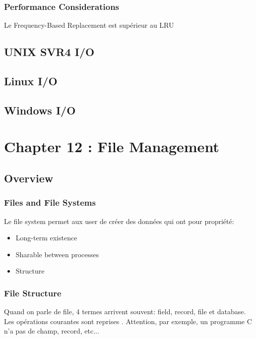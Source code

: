 \subsubsection{Performance Considerations}
Le Frequency-Based Replacement est supérieur au LRU

\subsection{UNIX SVR4 I/O }
\subsection{Linux I/O}
\subsection{Windows I/O}

\newpage


\section{Chapter 12 : File Management}

\subsection{Overview}
\subsubsection{Files and File Systems}
Le file system permet aux user de créer des données qui ont pour propriété:
\begin{itemize}
  \item Long-term existence
  \item Sharable between processes
  \item Structure
\end{itemize}

\subsubsection{File Structure}
Quand on parle de file, 4 termes arrivent souvent: field, record, file et database.
Les opérations courantes sont reprises \cite[p.~523]{stallings}.
Attention, par exemple, un programme C n'a pas de champ, record, etc...

